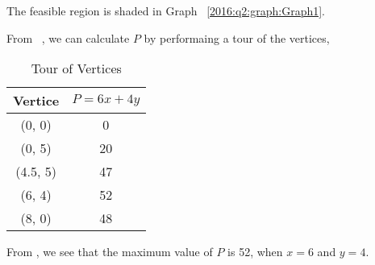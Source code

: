 \begin{subquestions}
\begin{subsubquestions}
\subsubquestion

The feasible region is shaded in Graph ~\ref{2016:q2:graph:Graph1}.


\subsubquestion

From ~, we can calculate $P$ by performaing a tour of the vertices,

\begin{table}[H]
	\centering
	\begin{tabular}{|c|c|}
		\hline
		Vertice & $P = 6x + 4y$ \\
		\hline
		(0, 0) & 0 \\
		(0, 5) & 20 \\
		(4.5, 5) & 47 \\
		(6, 4) & 52 \\
		(8, 0) & 48 \\
		\hline
	\end{tabular}
	\caption{\label{2016:q2:tab:P} Tour of Vertices}
\end{table}

From , we see that the maximum value of $P$ is 52, when $x=6$ and $y=4$.

\end{subsubquestions}


\subquestion

\begin{subsubquestions}
	
\subsubquestion


\end{subsubquestions}
\end{subquestions}
